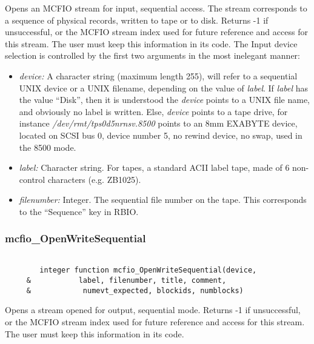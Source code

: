  Opens an MCFIO stream for input, sequential access. The stream corresponds
 to a sequence of physical records, written to tape or to disk. Returns -1
 if unsuccessful, or the MCFIO stream index 
 used for future reference and access for this stream. The user must keep
 this information in its code. 
 The Input device selection is controlled by the first two arguments 
 in the most inelegant manner:
\begin{itemize}
 
\item {\em device:} A  character
 string (maximum length 255), will refer to a  sequential UNIX device or a 
 UNIX filename, depending on the value of {\em label}.  If {\em label} has 
 the value ``Disk'', then it is understood the {\em device} points to 
 a UNIX file name, and obviously no label is written. Else, {\em device} points 
 to a tape drive, for instance {\em /dev/rmt/tps0d5nrnsv.8500} points to 
 an 8mm EXABYTE device, located on SCSI bus 0, device number 5, no rewind 
 device, no swap, used in the 8500 mode.  
\item {\em label:} Character string. For tapes, a standard ACII label tape, 
made of 6 non-control characters (e.g. ZB1025). 
\item {\em filenumber:} Integer. The sequential file number on the 
tape. This corresponds to the ``Sequence'' key in RBIO. 
\end{itemize}


\subsubsection{mcfio\_OpenWriteSequential}

\begin{verbatim}

        integer function mcfio_OpenWriteSequential(device,
     &           label, filenumber, title, comment,
     &            numevt_expected, blockids, numblocks)
\end{verbatim}

	Opens a stream opened for output, sequential mode. Returns -1
 if unsuccessful, or the MCFIO stream index 
 used for future reference and access for this stream. The user must keep
 this information in its code.
  
